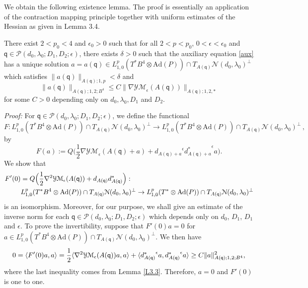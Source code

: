 \documentclass[11pt]{article}
\numberwithin{equation}{section} \setlength{\topmargin}{-35pt}
\newcommand{\PP}{\mathcal{P}}
\newcommand{\Ad}{\text{Ad}}
\newcommand{\YMe}{\mathcal{YM}_{\epsilon}}
\newcommand{\q}{\mathsf{q}}
\begin{document}
\noindent We obtain the following existence lemma. The proof is
essentially an application of the contraction mapping principle
together with uniform estimates of the Hessian as given in Lemma
3.4.
\begin{lemma} \label{L3.8} There exist $2<p_0<4$ and $\epsilon_0>0$ such that for all $2<p<p_0$, $0<\epsilon<\epsilon_0$ and
$\q\in\PP(d_0,\lambda_0;D_1,D_2;\epsilon)$, there exists $\delta>0$
such that the auxiliary equation \eqref{aux} has a unique solution
$a=a(\q)\in L^p_{1,0}(T^{\ast}B^4\otimes\Ad(P))\cap
T_{A(\q)}\mathcal{N}(d_0,\lambda_0)^{\perp}$ which satisfies
$\|a(\q)\|_{A(\q);1,p}<\delta$ and
\begin{equation}
\label{120} \|a(\q)\|_{A(\q);1,2;B^4}\le
C\|\nabla\YMe(A(\q))\|_{A(\q);1,2,\ast}
\end{equation}
for some $C>0$ depending only on $d_0,\lambda_0,D_1$ and $D_2$.
\end{lemma}
\textit{Proof:} For $\q\in\PP(d_0,\lambda_0;D_1,D_2;\epsilon)$, we
define the functional $$F:L^p_{1,0}(T^{\ast}B^4\otimes\Ad(P))\cap
T_{A(\q)}\mathcal{N}(d_0,\lambda_0)^{\perp} \to
L^p_{1,0}(T^{\ast}B^4\otimes\Ad(P))\cap
T_{A(\q)}\mathcal{N}(d_0,\lambda_0)^{\perp}\,,$$ by
$$F(a):=Q\Big(\frac{1}{2}\nabla\YMe(A(\q)+a)+
{d_{A(\q)+a}}^{\epsilon}{d_{A(\q)+a}^{\ast}}^{\epsilon}a\Big).$$
We show that
\begin{align}\notag
F'(0)&=Q\Big(\frac{1}{2}\nabla^2\YMe(A(\q))+d_{A(\q)}d_{A(\q)}^{\ast}\Big):\notag\\
&L^p_{1,0}(T^{\ast}B^4\otimes\Ad(P))\cap
T_{A(\q)}\mathcal{N}(d_0,\lambda_0)^{\perp}\to
L^p_{1,0}(T^{\ast}\otimes\Ad(P))\cap
T_{A(\q)}\mathcal{N}(d_0,\lambda_0)^{\perp}\notag
\end{align} is an isomorphism. Moreover, for our purpose, we shall give an estimate of the inverse norm for each $\q\in\PP(d_0,\lambda_0;D_1,D_2;\epsilon)$ which depends only on $d_0$, $D_1$, $D_1$ and $\epsilon$. To prove the invertibility, suppose
that $F'(0)a=0$ for $a\in L^p_{1,0}(T^{\ast}B^4\otimes\Ad(P))\cap
T_{A(\q)}\mathcal{N}(d_0,\lambda_0)^{\perp}$. We then have
\begin{equation}
\notag 0=\langle F'(0)a,a\rangle
=\frac{1}{2}\langle\nabla^2\YMe(A(\q))a,a\rangle+\langle
{d_{A(\q)}^{\ast}}^{\epsilon}a,{d_{A(\q)}^{\ast}}^{\epsilon}a\rangle
\ge C\|a\|_{A(\q);1,2;B^4}^2,
\end{equation}
where the last inequality comes from Lemma \ref{L3.3}. Therefore,
$a=0$ and $F'(0)$ is one to one.
\end{document}
